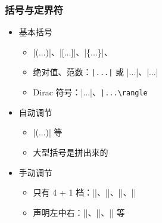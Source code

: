 \begin{frame}[fragile]
\frametitle{括号与定界符}
\begin{itemize}
  \item<+-> 基本括号

    \begin{itemize}
      \item |(...)|、|[...]|、|\{...\}|、
      \item 绝对值、范数：\lstinline[style=style@inline]+|...|+ 或 |\vert...\vert|、|\Vert...\Vert|
      \item Dirac 符号：|\angle...\rangle|、\lstinline[style=style@inline]+|...\rangle+
    \end{itemize}

  \item<+-> 自动调节

    \begin{itemize}
      \item |\left(...\right)| 等
      \item 大型括号是拼出来的
    \end{itemize}

  \item<+-> 手动调节

    \begin{itemize}
      \item 只有 4 + 1 档：|\big|、|\Big|、|\bigg|、|\Bigg|
      \item 声明左中右：|\bigl|、|\bigm|、|\bigr| 等
    \end{itemize}
\end{itemize}
\end{frame}

